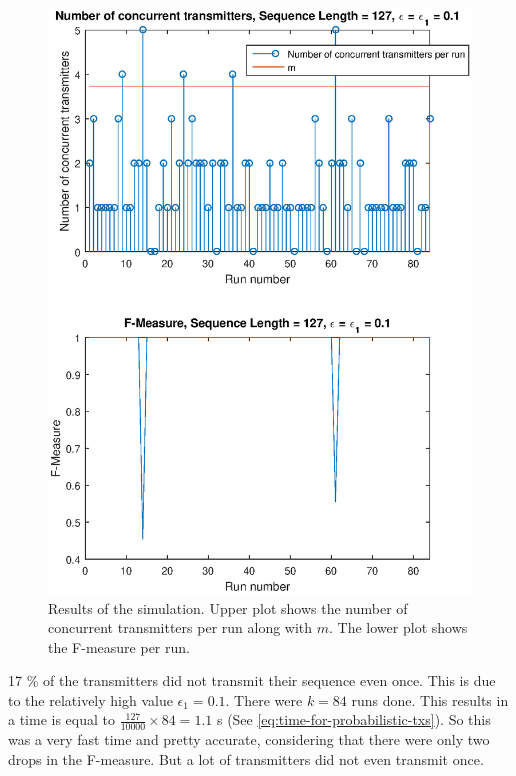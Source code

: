 \begin{figure}[tbp]
	\centering
	\includegraphics[width=\textwidth]{chapters/evaluation-chapters/simulation/sim-concurrent-tx-and-f-measure-eps=1-n=7.eps}
	\caption{Results of the simulation. Upper plot shows the number of concurrent transmitters per run along with $m$. The lower plot shows the F-measure per run.}
	\label{fig:sim-concurrent-tx-and-f-measure-eps=1-n=7}
\end{figure}

17 \% of the transmitters did not transmit their sequence even once.
This is due to the relatively high value $\epsilon_1 = 0.1$.
There were $k = 84$ runs done.
This results in a time is equal to $\frac{127}{10000} \times 84 = 1.1$ s (See \autoref{eq:time-for-probabilistic-txs}).
So this was a very fast time and pretty accurate, considering that there were only two drops in the F-measure.
But a lot of transmitters did not even transmit once.










